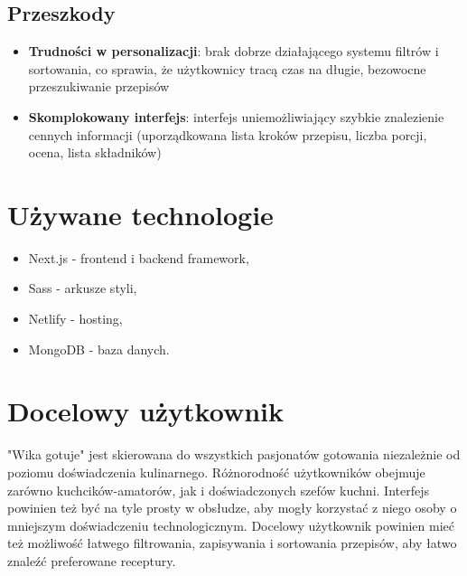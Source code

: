 \documentclass{article}
\begin{document}
\subsection{Przeszkody}
\begin{itemize}
    \item \textbf{Trudności w personalizacji}: brak dobrze działającego systemu filtrów i sortowania, co sprawia, że użytkownicy tracą czas na długie, bezowocne przeszukiwanie przepisów
    \item \textbf{Skomplokowany interfejs}: interfejs uniemożliwiający szybkie znalezienie cennych informacji (uporządkowana lista kroków przepisu, liczba porcji, ocena, lista składników)
\end{itemize}


\section{Używane technologie}
\begin{itemize}
    \item Next.js - frontend i backend framework,
    \item Sass - arkusze styli,
    \item Netlify - hosting,
    \item MongoDB - baza danych.
\end{itemize}

\section{Docelowy użytkownik}
"Wika gotuje" jest skierowana do wszystkich pasjonatów gotowania niezależnie od poziomu doświadczenia kulinarnego. Różnorodność użytkowników obejmuje zarówno kuchcików-amatorów, jak 
i doświadczonych szefów kuchni. Interfejs powinien też być na tyle prosty w obsłudze, aby mogły korzystać z niego osoby o mniejszym doświadczeniu technologicznym. 
\newline
Docelowy użytkownik powinien mieć też możliwość łatwego filtrowania, zapisywania i sortowania przepisów, aby łatwo znaleźć preferowane receptury.

\end{document}
